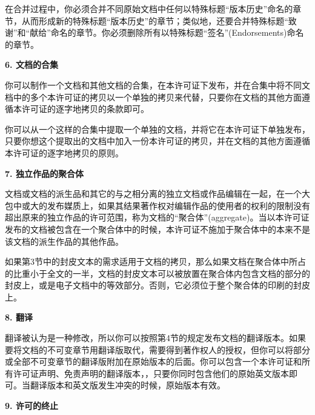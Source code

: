 在合并过程中，你必须合并不同原始文档中任何以特殊标题``版本历史''命名的章节，从而形成新的特殊标题``版本历史''的章节；类似地，还要合并特殊标题``致谢''和``献给''命名的章节。你必须删除所有以特殊标题``签名''(Endorsements)命名的章节。

\begin{center}
{\Large\bf 6. 文档的合集\par}
\end{center}


你可以制作一个文档和其他文档的合集，在本许可证下发布，并在合集中将不同文档中的多个本许可证的拷贝以一个单独的拷贝来代替，只要你在文档的其他方面遵循本许可证的逐字地拷贝的条款即可。

你可以从一个这样的合集中提取一个单独的文档，并将它在本许可证下单独发布，只要你想这个提取出的文档中加入一份本许可证的拷贝，并在文档的其他方面遵循本许可证的逐字地拷贝的原则。

\begin{center}
{\Large\bf 7. 独立作品的聚合体\par}
\end{center}


文档或文档的派生品和其它的与之相分离的独立文档或作品编辑在一起，在一个大包中或大的发布媒质上，如果其结果著作权对编辑作品的使用者的权利的限制没有超出原来的独立作品的许可范围，称为文档的``聚合体''(aggregate)。当以本许可证发布的文档被包含在一个聚合体中的时候，本许可证不施加于聚合体中的本来不是该文档的派生作品的其他作品。

如果第3节中的封皮文本的需求适用于文档的拷贝，那么如果文档在聚合体中所占的比重小于全文的一半，文档的封皮文本可以被放置在聚合体内包含文档的部分的封皮上，或是电子文档中的等效部分。否则，它必须位于整个聚合体的印刷的封皮上。


\begin{center}
{\Large\bf 8. 翻译\par}
\end{center}


翻译被认为是一种修改，所以你可以按照第4节的规定发布文档的翻译版本。如果要将文档的不可变章节用翻译版取代，需要得到著作权人的授权，但你可以将部分或全部不可变章节的翻译版附加在原始版本的后面。你可以包含一个本许可证和所有许可证声明、免责声明的翻译版本，，只要你同时包含他们的原始英文版本即可。当翻译版本和英文版发生冲突的时候，原始版本有效。

\begin{center}
{\Large\bf 9. 许可的终止\par}
\end{center}


